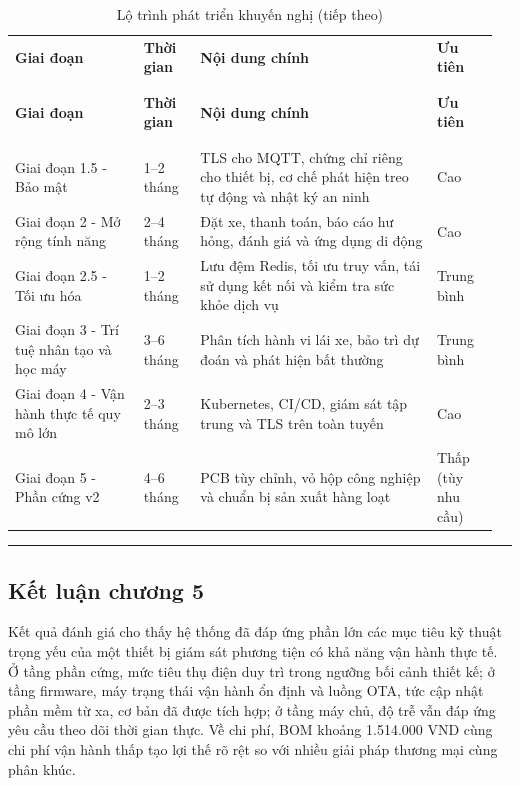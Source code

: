 \documentclass[a4paper]{extarticle}
\newcommand{\thesissettableid}[2]{%
  \renewcommand{\thetable}{#1}%
  \renewcommand{\theHtable}{#2}%
}
\begin{document}
{\thesissettableid{5.10}{tab-ch5-lo-trinh-phat-trien-khuyen-nghi}
\def\LTcaptype{table}
\begin{longtable}{|L{0.251\linewidth}|L{0.115\linewidth}|L{0.460\linewidth}|L{0.129\linewidth}|}
\caption{Lộ trình phát triển khuyến nghị}\label{tab:ch5-lo-trinh-phat-trien-khuyen-nghi}\\
\hline \textbf{Giai đoạn} & \textbf{Thời gian} & \textbf{Nội dung chính} & \textbf{Ưu tiên} \\
\\\hline
\endfirsthead
\caption[]{Lộ trình phát triển khuyến nghị (tiếp theo)}\\
\hline \textbf{Giai đoạn} & \textbf{Thời gian} & \textbf{Nội dung chính} & \textbf{Ưu tiên} \\
\\\hline
\endhead
\\\hline
\endfoot
\endlastfoot
Giai đoạn 1.5 - Bảo mật & 1--2 tháng & TLS cho MQTT, chứng chỉ riêng cho
thiết bị, cơ chế phát hiện treo tự động và nhật ký an ninh & Cao \\\hline
Giai đoạn 2 - Mở rộng tính năng & 2--4 tháng & Đặt xe, thanh toán, báo
cáo hư hỏng, đánh giá và ứng dụng di động & Cao \\\hline
Giai đoạn 2.5 - Tối ưu hóa & 1--2 tháng & Lưu đệm Redis, tối ưu truy
vấn, tái sử dụng kết nối và kiểm tra sức khỏe dịch vụ & Trung bình \\\hline
Giai đoạn 3 - Trí tuệ nhân tạo và học máy & 3--6 tháng & Phân tích hành vi lái xe, bảo trì dự
đoán và phát hiện bất thường & Trung bình \\\hline
Giai đoạn 4 - Vận hành thực tế quy mô lớn & 2--3 tháng & Kubernetes,
CI/CD, giám sát tập trung và TLS trên toàn tuyến & Cao \\\hline
Giai đoạn 5 - Phần cứng v2 & 4--6 tháng & PCB tùy chỉnh, vỏ hộp công
nghiệp và chuẩn bị sản xuất hàng loạt & Thấp (tùy nhu cầu) \\\hline
\end{longtable}
}


\begin{center}\rule{0.5\linewidth}{0.5pt}\end{center}

\subsection{Kết luận chương
5}\label{kux1ebft-luux1eadn-chux1b0ux1a1ng-5}

Kết quả đánh giá cho thấy hệ thống đã đáp ứng phần lớn các mục tiêu kỹ
thuật trọng yếu của một thiết bị giám sát phương tiện có khả năng vận
hành thực tế. Ở tầng phần cứng, mức tiêu thụ điện duy trì trong ngưỡng
bối cảnh thiết kế; ở tầng firmware, máy trạng thái vận hành ổn định và luồng OTA,
tức cập nhật phần mềm từ xa, cơ
bản đã được tích hợp; ở tầng máy chủ, độ trễ vẫn đáp ứng yêu cầu theo dõi
thời gian thực. Về chi phí, BOM khoảng 1.514.000 VND cùng chi phí vận
hành thấp tạo lợi thế rõ rệt so với nhiều giải pháp thương mại cùng phân
khúc.
\end{document}
